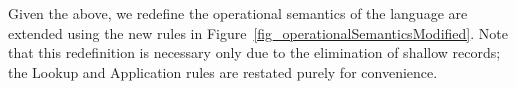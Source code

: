 \documentclass[nocopyright]{sigplanconf}
\begin{document}
Given the above, we redefine the operational semantics of the language are extended using the new rules in Figure~\ref{fig_operationalSemanticsModified}.  Note that this redefinition is necessary only due to the elimination of shallow records; the Lookup and Application rules are restated purely for convenience.

\begin{figure}
    \begin{mathpar}






\end{mathpar}
\end{figure}
\end{document}
